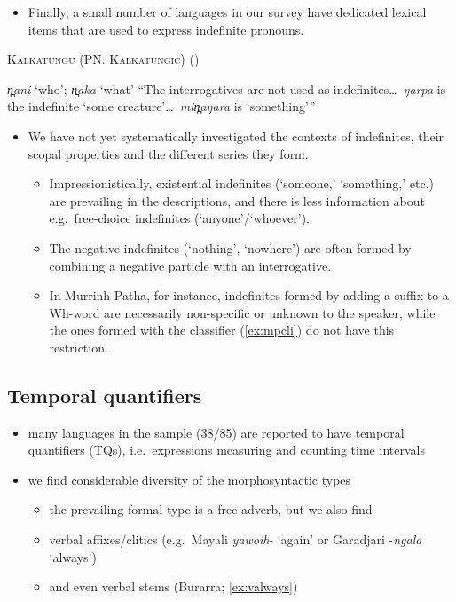 \documentclass{article}
\makeatletter
\newcommand{\ofy}{/85} %
\makeatother
\begin{document}
\begin{itemize}
    \item Finally, a small number of languages in our survey have dedicated lexical items that are used to express indefinite pronouns.
\end{itemize}

\begin{exe}
  \ex \textsc{Kalkatungu (PN: Kalkatungic)} (\citealt[104--5]{blake79})
  \begin{xlist}
    \ex \textit{\charis n̪ani} `who'; \textit{\charis n̪aka} `what'
    \ex ``The interrogatives are not used as indefinites\ldots\ \textit{\charis ŋarpa} is the indefinite `some creature'\ldots\ \textit{\charis min̪aŋara} is `something'\thinspace''
  \end{xlist}
\end{exe}

\begin{itemize}
\item We have not yet systematically investigated the contexts of indefinites, their scopal properties and the different series they form.
  \begin{itemize}
  \item Impressionistically, existential indefinites (`someone,' `something,' etc.) are prevailing in the descriptions, and there is less information about e.g.\ free-choice indefinites (`anyone'/`whoever').
  \item The negative indefinites (`nothing', `nowhere') are often formed by combining a negative particle with an interrogative.%
  \item In Murrinh-Patha, for instance, indefinites formed by adding a suffix to a Wh-word are necessarily non-specific or unknown to the speaker, while the ones formed with the classifier (\ref{ex:mpcli}) do not have this restriction.
  \end{itemize}
  \end{itemize}


\subsection{Temporal quantifiers}
\label{sec:temporals}
\begin{itemize}
\item many languages in the sample (38\ofy) are reported to have temporal quantifiers (TQs), i.e.\ expressions measuring and counting time intervals %
\item we find considerable diversity of the morphosyntactic types
  \begin{itemize}
  \item the prevailing formal type is a free adverb, but we also find
  \item verbal affixes/clitics (e.g.\ Mayali \textit{yawoih}- `again' or Garadjari -\textit{ngala} `always')
  \item and even verbal stems (Burarra; \ref{ex:valways})
  \end{itemize}
\end{itemize}
\end{document}
